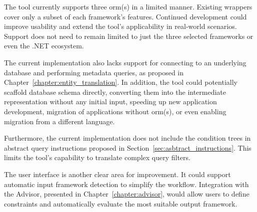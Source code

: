 The tool currently supports three \acrshort{orm}(s) in a limited manner. Existing wrappers cover only a subset of each framework's features. Continued development could improve usability and extend the tool's applicability in real-world scenarios. Support does not need to remain limited to just the three selected frameworks or even the .NET ecosystem. 

The current implementation also lacks support for connecting to an underlying database and performing metadata queries, as proposed in Chapter~\ref{chapter:entity_translation}. In addition, the tool could potentially scaffold database schema directly, converting them into the intermediate representation without any initial input, speeding up new application development, migration of applications without \acrshort{orm}(s), or even enabling migration from a different language.

Furthermore, the current implementation does not include the condition trees in abstract query instructions proposed in Section~\ref{sec:asbtract_instructions}. This limits the tool's capability to translate complex query filters.
 
The user interface is another clear area for improvement. It could support automatic input framework detection to simplify the workflow. Integration with the Advisor, presented in Chapter~\ref{chapter:advisor}, would allow users to define constraints and automatically evaluate the most suitable output framework.
